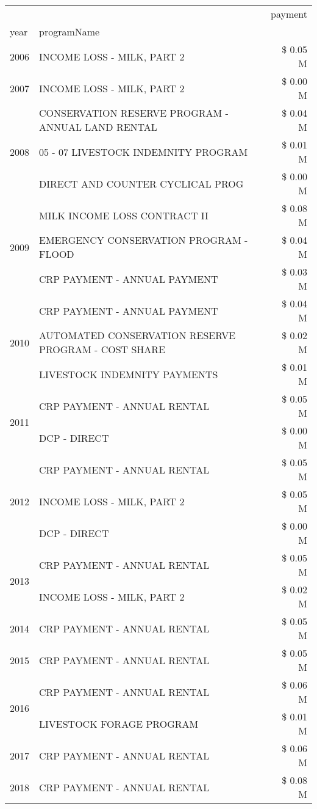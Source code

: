 \begin{tabular}{llr}
\toprule
 &  & payment \\
year & programName &  \\
\midrule
2006 & INCOME LOSS - MILK, PART 2 & \$ 0.05 M \\
\cline{1-3}
2007 & INCOME LOSS - MILK, PART 2 & \$ 0.00 M \\
\cline{1-3}
\multirow[t]{3}{*}{2008} & CONSERVATION RESERVE PROGRAM - ANNUAL LAND RENTAL & \$ 0.04 M \\
 & 05 - 07 LIVESTOCK INDEMNITY PROGRAM & \$ 0.01 M \\
 & DIRECT AND COUNTER CYCLICAL PROG & \$ 0.00 M \\
\cline{1-3}
\multirow[t]{3}{*}{2009} & MILK INCOME LOSS CONTRACT II & \$ 0.08 M \\
 & EMERGENCY CONSERVATION PROGRAM - FLOOD & \$ 0.04 M \\
 & CRP PAYMENT - ANNUAL PAYMENT & \$ 0.03 M \\
\cline{1-3}
\multirow[t]{3}{*}{2010} & CRP PAYMENT - ANNUAL PAYMENT & \$ 0.04 M \\
 & AUTOMATED CONSERVATION RESERVE PROGRAM - COST SHARE & \$ 0.02 M \\
 & LIVESTOCK INDEMNITY PAYMENTS & \$ 0.01 M \\
\cline{1-3}
\multirow[t]{2}{*}{2011} & CRP PAYMENT - ANNUAL RENTAL & \$ 0.05 M \\
 & DCP - DIRECT & \$ 0.00 M \\
\cline{1-3}
\multirow[t]{3}{*}{2012} & CRP PAYMENT - ANNUAL RENTAL & \$ 0.05 M \\
 & INCOME LOSS - MILK, PART 2 & \$ 0.05 M \\
 & DCP - DIRECT & \$ 0.00 M \\
\cline{1-3}
\multirow[t]{2}{*}{2013} & CRP PAYMENT - ANNUAL RENTAL & \$ 0.05 M \\
 & INCOME LOSS - MILK, PART 2 & \$ 0.02 M \\
\cline{1-3}
2014 & CRP PAYMENT - ANNUAL RENTAL & \$ 0.05 M \\
\cline{1-3}
2015 & CRP PAYMENT - ANNUAL RENTAL & \$ 0.05 M \\
\cline{1-3}
\multirow[t]{2}{*}{2016} & CRP PAYMENT - ANNUAL RENTAL & \$ 0.06 M \\
 & LIVESTOCK FORAGE PROGRAM & \$ 0.01 M \\
\cline{1-3}
2017 & CRP PAYMENT - ANNUAL RENTAL & \$ 0.06 M \\
\cline{1-3}
\multirow[t]{2}{*}{2018} & CRP PAYMENT - ANNUAL RENTAL & \$ 0.08 M \\

\end{tabular}
